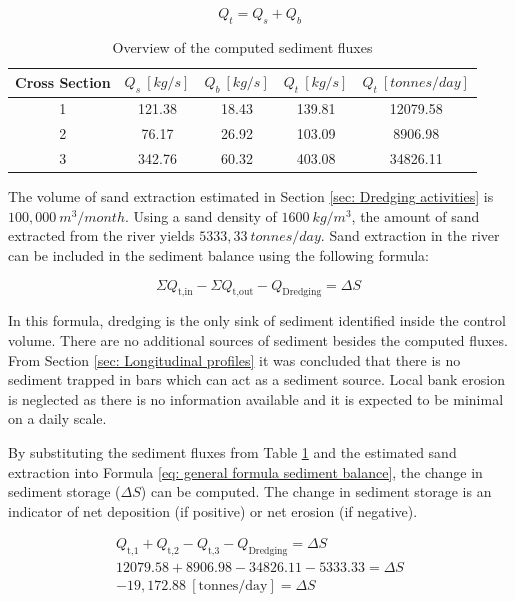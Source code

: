 \begin{equation}
    Q_t = Q_s + Q_b
    \label{eq: Total sediment flux}
\end{equation}

\begin{table}[H]
    \centering
    \caption{Overview of the computed sediment fluxes}
    \label{tab: Overview sediment fluxes}
    \setlength{\tabcolsep}{8pt}
    \begin{tabular}{c c c c c}
        \hline
        Cross Section & $Q_s~[kg/s]$ & $Q_b~[kg/s]$ & $Q_t~[kg/s]$ &  $Q_t~[tonnes/day]$ \\
        \hline
        1 & 121.38 &  18.43 & 139.81 & 12079.58\\
        2 & 76.17  &  26.92 & 103.09 & 8906.98\\
        3 & 342.76 & 60.32 & 403.08 & 34826.11\\
        \hline
    \end{tabular}
\end{table}

The volume of sand extraction estimated in Section \ref{sec: Dredging activities} is $100,000~m^3/month$. Using a sand density of $1600~kg/m^3$, the amount of sand extracted from the river yields $5333,33~tonnes/day$. Sand extraction in the river can be included in the sediment balance using the following formula:

\begin{equation}
    \Sigma Q_\text{t,in}  - \Sigma Q_\text{t,out} - Q_\text{Dredging}  = \Delta S \
    \label{eq: general formula sediment balance}
\end{equation}

In this formula, dredging is the only sink of sediment identified inside the control volume. There are no additional sources of sediment besides the computed fluxes. From Section \ref{sec: Longitudinal profiles} it was concluded that there is no sediment trapped in bars which can act as a sediment source. Local bank erosion is neglected as there is no information available and it is expected to be minimal on a daily scale.

By substituting the sediment fluxes from Table \ref{tab: Overview sediment fluxes} and the estimated sand extraction into Formula \ref{eq: general formula sediment balance}, the 
change in sediment storage ($\Delta S$) can be computed. The change in sediment storage is an indicator of net deposition (if positive) or net erosion (if negative).

\begin{subequations}\label{eq:sediment_balance}
    \begin{gather}
        Q_\text{t,1} + Q_\text{t,2} - Q_\text{t,3} - Q_\text{Dredging} = \Delta S \label{eq:sediment_balance_a} \\
        12079.58 + 8906.98 - 34826.11 - 5333.33 = \Delta S \label{eq:sediment_balance_b} \\
        -19{,}172.88~[\text{tonnes/day}] = \Delta S
        \label{eq:sediment_balance_c}
    \end{gather}
\end{subequations}


